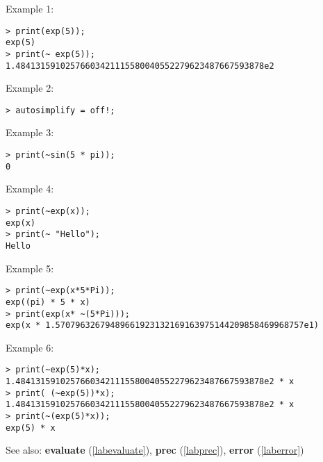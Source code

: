 \noindent Example 1: 
\begin{center}\begin{minipage}{15cm}\begin{Verbatim}[frame=single]
> print(exp(5));
exp(5)
> print(~ exp(5));
1.48413159102576603421115580040552279623487667593878e2
\end{Verbatim}
\end{minipage}\end{center}
\noindent Example 2: 
\begin{center}\begin{minipage}{15cm}\begin{Verbatim}[frame=single]
> autosimplify = off!;
\end{Verbatim}
\end{minipage}\end{center}
\noindent Example 3: 
\begin{center}\begin{minipage}{15cm}\begin{Verbatim}[frame=single]
> print(~sin(5 * pi));
0
\end{Verbatim}
\end{minipage}\end{center}
\noindent Example 4: 
\begin{center}\begin{minipage}{15cm}\begin{Verbatim}[frame=single]
> print(~exp(x));
exp(x)
> print(~ "Hello");
Hello
\end{Verbatim}
\end{minipage}\end{center}
\noindent Example 5: 
\begin{center}\begin{minipage}{15cm}\begin{Verbatim}[frame=single]
> print(~exp(x*5*Pi));
exp((pi) * 5 * x)
> print(exp(x* ~(5*Pi)));
exp(x * 1.57079632679489661923132169163975144209858469968757e1)
\end{Verbatim}
\end{minipage}\end{center}
\noindent Example 6: 
\begin{center}\begin{minipage}{15cm}\begin{Verbatim}[frame=single]
> print(~exp(5)*x);
1.48413159102576603421115580040552279623487667593878e2 * x
> print( (~exp(5))*x);
1.48413159102576603421115580040552279623487667593878e2 * x
> print(~(exp(5)*x));
exp(5) * x
\end{Verbatim}
\end{minipage}\end{center}
See also: \textbf{evaluate} (\ref{labevaluate}), \textbf{prec} (\ref{labprec}), \textbf{error} (\ref{laberror})
